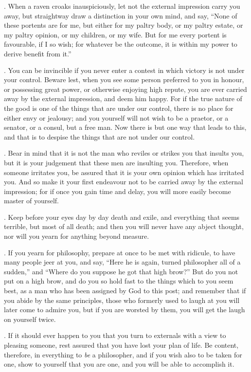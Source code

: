 . When a raven croaks inauspiciously, let not the external impression carry you away, but straightway draw a distinction in your own mind, and say, ``None of these portents are for me, but either for my paltry body, or my paltry estate, or my paltry opinion, or my children, or my wife. But for me every portent is favourable, if I so wish; for whatever be the outcome, it is within my power to derive benefit from it.''

. You can be invincible if you never enter a contest in which victory is not under your control. Beware lest, when you see some person preferred to you in honour, or possessing great power, or otherwise enjoying high repute, you are ever carried away by the external impression, and deem him happy. For if the true nature of the good is one of the things that are under our control, there is no place for either envy or jealousy; and you yourself will not wish to be a praetor, or a senator, or a consul, but a free man. Now there is but one way that leads to this, and that is to despise the things that are not under our control.

. Bear in mind that it is not the man who reviles or strikes you that insults you, but it is your judgement that these men are insulting you. Therefore, when someone irritates you, be assured that it is your own opinion which has irritated you. And so make it your first endeavour not to be carried away by the external impression; for if once you gain time and delay, you will more easily become master of yourself.

. Keep before your eyes day by day death and exile, and everything that seems terrible, but most of all death; and then you will never have any abject thought, nor will you yearn for anything beyond measure.

. If you yearn for philosophy, prepare at once to be met with ridicule, to have many people jeer at you, and say, ``Here he is again, turned philosopher all of a sudden,'' and ``Where do you suppose he got that high brow?'' But do you not put on a high brow, and do you so hold fast to the things which to you seem best, as a man who has been assigned by God to this post; and remember that if you abide by the same principles, those who formerly used to laugh at you will later come to admire you, but if you are worsted by them, you will get the laugh on yourself twice.

. If it should ever happen to you that you turn to externals with a view to pleasing someone, rest assured that you have lost your plan of life. Be content, therefore, in everything to \emph{be} a philosopher, and if you wish also to be taken for one, show to yourself that you are one, and you will be able to accomplish it.

